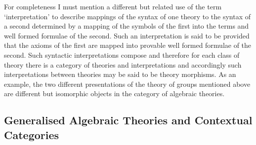 For completeness I must mention a different but related use of the term `interpretation' to describe 
mappings of the syntax of one theory to the syntax of a second
 determined by a mapping of the symbols of the first into the terms and well formed formulae of the second. 
Such an interpretation is said to be  provided that the axioms of the first are mapped into provable well formed formulae of the second.  Such syntactic interpretations compose and therefore for each class of theory there is a category of theories and interpretations and accordingly such 
interpretations between theories may be said to be theory morphisms.
As an example, the two different presentations of the theory of groups mentioned above are different but isomorphic objects in the category of algebraic theories. 

\subsection{Generalised Algebraic Theories 	and Contextual Categories}


